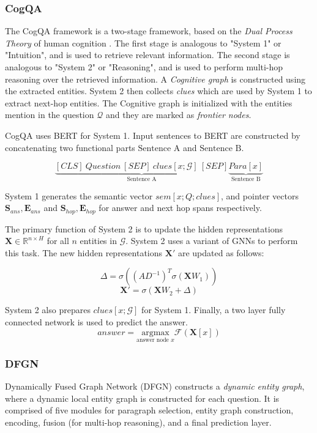 \documentclass[sigplan,screen,nonacm]{acmart}
\begin{document}
\subsubsection{CogQA}
The CogQA framework \cite{RN118} is a two-stage framework, based on the \emph{Dual Process Theory} of human cognition \cite{RN137}.
The first stage is analogous to "System 1" or "Intuition", and is used to retrieve relevant information. The second stage is analogous to
"System 2" or "Reasoning", and is used to perform multi-hop reasoning over the retrieved information. A \emph{Cognitive graph} is constructed
using the extracted entities. System 2 then collects \emph{clues} which are used by System 1 to extract next-hop entities.
The Cognitive graph is initialized with the entities mention in the question $\mathcal{Q}$ and they are marked as \emph{frontier nodes}.

CogQA uses BERT \cite{RN153} for System 1. Input sentences to BERT are constructed by concatenating two functional parts 
$\text{Sentence A}$ and $\text{Sentence B}$.

$$
\underbrace{{[CLS]\: Question \: [SEP]\: clues[x; \mathcal{G}]\: [SEP]}}_{\text{Sentence A}} \underbrace{{Para[x]}}_{\text{Sentence B}}
$$

System 1 generates the semantic vector $sem[x; Q; clues]$, and pointer vectors 
$\boldsymbol{S}_{ans} , \boldsymbol{E}_{ans} $ and $\boldsymbol{S}_{hop} , \boldsymbol{E}_{hop} $ for answer and next hop spans respectively.

The primary function of System 2 is to update the hidden representations $\boldsymbol{X} \in \mathbb{R}^{n \times H}$ for all $n$ entities 
in $\mathcal{G}$. System 2 uses a variant of GNNs \cite{RN2} to perform this task. The new hidden representations $\boldsymbol{X'}$ are updated 
as follows:

$$
\Delta = \sigma((AD^{-1})^T \sigma (\boldsymbol{X}W_1))
$$
$$
\boldsymbol{X'} = \sigma(\boldsymbol{X}W_2 + \Delta)
$$

System 2 also prepares $clues[x; \mathcal{G}]$ for System 1. Finally, a two layer fully connected network is used to predict the answer.
$$
answer = \underset{\text{answer node }x}{\mathrm{argmax}}  \mathcal{F}(\boldsymbol{X}[x])
$$

\subsubsection{DFGN}
Dynamically Fused Graph Network (DFGN) \cite{RN122} constructs a \emph{dynamic entity graph}, where a dynamic local entity graph is 
constructed for each question. It is comprised of five modules for paragraph selection, entity graph construction, encoding, fusion 
(for multi-hop reasoning), and a final prediction layer.
\end{document}
